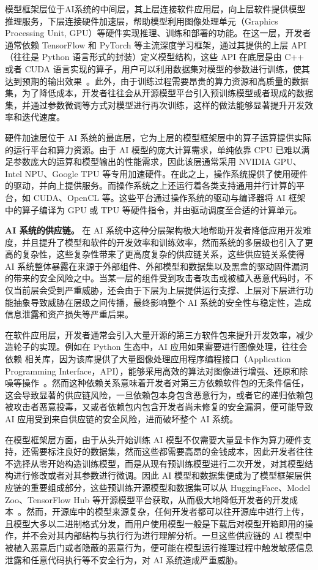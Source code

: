 模型框架层位于AI系统的中间层，其上层连接软件应用层，向上层软件提供模型推理服务，下层连接硬件加速层，帮助模型利用图像处理单元（Graphics Processing Unit, GPU）等硬件实现推理、训练和部署的功能。在这一层，开发者通常依赖 TensorFlow 和 PyTorch 等主流深度学习框架，通过其提供的上层 API（往往是 Python 语言形式的封装）定义模型结构，这些 API 在底层是由 C++ 或者 CUDA 语言实现的算子，用户可以利用数据集对模型的参数进行训练，使其达到预期的输出效果~\cite{abadi2016tensorflow,paszke2019pytorch}。此外，由于训练过程需要昂贵的算力资源和高质量的数据集，为了降低成本，开发者往往会从开源模型平台引入预训练模型或者现成的数据集，并通过参数微调等方式对模型进行再次训练，这样的做法能够显著提升开发效率和迭代速度。

硬件加速层位于 AI 系统的最底层，它为上层的模型框架层中的算子运算提供实际的运行平台和算力资源。由于 AI 模型的庞大计算需求，单纯依靠 CPU 已难以满足参数庞大的运算和模型输出的性能需求，因此该层通常采用 NVIDIA GPU、Intel NPU、Google TPU 等专用加速硬件。在此之上，操作系统提供了使用硬件的驱动，并向上提供服务。而操作系统之上还运行着各类支持通用并行计算的平台，如 CUDA、OpenCL 等。这些平台通过操作系统的驱动与编译器将 AI 框架中的算子编译为 GPU 或 TPU 等硬件指令，并由驱动调度至合适的计算单元。

\textbf{AI 系统的供应链。}
在 AI 系统中这种分层架构极大地帮助开发者降低应用开发难度，并且提升了模型和软件的开发效率和训练效率，然而系统的多层级也引入了更高的复杂性，这些复杂性带来了更高度复杂的供应链关系，这些供应链关系使得 AI 系统整体暴露在来源于外部组件、外部模型和数据集以及黑盒的驱动固件漏洞的带来的安全风险之中。当某一层的组件受到攻击者攻击或被植入恶意代码时，不仅当前层会受到严重威胁，还会由于下层为上层提供运行支撑、上层对下层进行功能抽象导致威胁在层级之间传播，最终影响整个 AI 系统的安全性与稳定性，造成信息泄露和资产损失等严重后果。

在软件应用层，开发者通常会引入大量开源的第三方软件包来提升开发效率，减少造轮子的实现。例如在 Python 生态中，AI 应用如果需要进行图像处理，往往会依赖  相关库，因为该库提供了大量图像处理应用程序编程接口（Application Programming Interface，API），能够采用高效的算法对图像进行增强、还原和除噪等操作~\cite{opencv-python}。然而这种依赖关系意味着开发者对第三方依赖软件包的无条件信任，这会导致显著的供应链风险，一旦依赖包本身包含恶意行为，或者它的递归依赖包被攻击者恶意投毒，又或者依赖包内包含开发者尚未修复的安全漏洞，便可能导致 AI 应用受到来自供应链的安全风险，进而破坏整个 AI 系统。

在模型框架层方面，由于从头开始训练 AI 模型不仅需要大量显卡作为算力硬件支持，还需要标注良好的数据集，然而这些都需要高昂的金钱成本，因此开发者往往不选择从零开始构造训练模型，而是从现有预训练模型进行二次开发，对其模型结构进行修改或者对其参数进行微调。因此 AI 模型和数据集便成为了模型框架层供应链的重要组成部分，这些预训练开源模型和数据集可以从 HuggingFace、Model Zoo、TensorFlow Hub 等开源模型平台获取，从而极大地降低开发者的开发成本~\cite{huggingface2024,modelzoo2024,tensorflowhub2024}。然而，开源库中的模型来源复杂，任何开发者都可以往开源库中进行上传，且模型大多以二进制格式分发，而用户使用模型一般是下载后对模型开箱即用的操作，并不会对其内部结构与执行行为进行理解分析。一旦这些供应链的 AI 模型中被植入恶意后门或者隐蔽的恶意行为，便可能在模型运行推理过程中触发敏感信息泄露和任意代码执行等不安全行为，对 AI 系统造成严重威胁。

